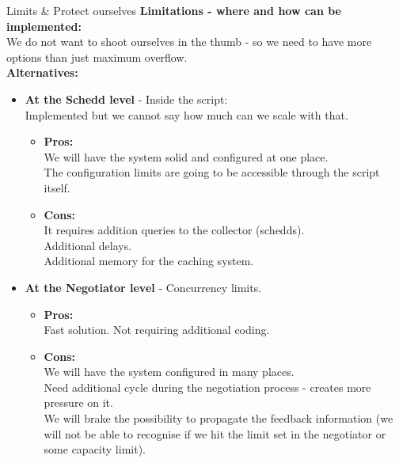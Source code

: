 \documentclass[8pt,mathserif,a4paper,oneside,pdf]{beamer}
\begin{document}
\begin{frame}[shrink]{Limits \& Protect ourselves}
  \textbf{Limitations - where and how can be implemented:}\\
  We do not want to shoot ourselves in the thumb - so we need to have more options than just maximum overflow.\\
  \textbf{Alternatives:}\\
  \begin{itemize}
  \item
    \textbf{At the Schedd level} - Inside the script:\\
    Implemented but we cannot say how much can we scale with that.
    \begin{itemize}
    \item
      \textbf{Pros:}\\
      We will have the system solid and configured at one place.\\
      The configuration limits are going to be accessible through the script itself.
    \item
      \textbf{Cons:}\\
      It requires addition queries to the collector (schedds).\\
      Additional delays.\\
      Additional memory for the caching system.\\
    \end{itemize}
  \item
    \textbf{At the Negotiator level} - Concurrency limits.\\
        \begin{itemize}
        \item
          \textbf{Pros:}\\
          Fast solution. Not requiring additional coding.
        \item
          \textbf{Cons:}\\
          We will have the system configured in many places.\\
          Need additional cycle during the negotiation process - creates more pressure on it.\\
          We will brake the possibility to propagate the feedback information (we will not be able to recognise if we hit the limit set in the negotiator or some capacity limit).
        \end{itemize}
  \end{itemize}
\end{frame}
\end{document}
